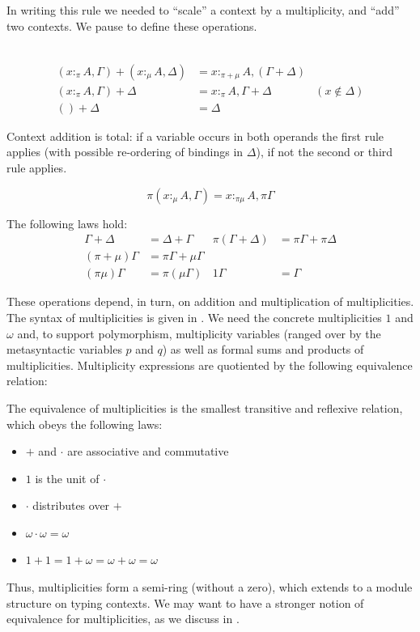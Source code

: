 \documentclass[acmsmall,screen]{acmart}\settopmatter{}
\begin{document}
In writing this rule we needed to ``scale'' a context by
a multiplicity, and ``add'' two contexts.  We pause to define these operations.
\begin{definition}~
  \begin{align*}
    (x :_π A,Γ) + (x :_{μ} A,Δ) &= x :_{π+μ} A, (Γ+Δ)\\
    (x :_π A,Γ) + Δ &= x :_π A, Γ+Δ & (x ∉ Δ)\\
    () + Δ &= Δ
  \end{align*}
\end{definition}
\noindent
Context addition is total: if a variable occurs in both operands the
first rule applies (with possible re-ordering of bindings in $Δ$), if
not the second or third rule applies.

\begin{definition}
  \begin{displaymath}
    π(x :_{μ} A, Γ) =  x :_{πμ} A, πΓ
  \end{displaymath}
\end{definition}

\begin{lemma}
  The following laws hold:
  \begin{align*}
    Γ + Δ &= Δ + Γ &
    π (Γ+Δ) &= π Γ + π Δ\\
    (π+μ) Γ &= π Γ+ μ Γ \\
    (πμ) Γ &= π (μ Γ) &
    1 Γ &= Γ
  \end{align*}
\end{lemma}

These operations depend, in turn, on addition and multiplication of multiplicities.
The syntax of multiplicities is given in .
We need the concrete multiplicities $1$ and $ω$ and, to support polymorphism,
multiplicity variables (ranged over by the metasyntactic
variables \(p\) and \(q\)) as well as formal sums and products of multiplicities.
%
Multiplicity expressions are quotiented by the following equivalence
relation:
\begin{definition}
  \label{def:equiv-multiplicity}
  The equivalence of multiplicities is the smallest transitive and
  reflexive relation, which obeys the following laws:
\begin{itemize}
\item $+$ and $·$ are associative and commutative
\item $1$ is the unit of $·$
\item $·$ distributes over $+$
\item $ω · ω = ω$
\item $1 + 1 = 1 + ω = ω + ω = ω$
\end{itemize}
\end{definition}
Thus, multiplicities form a semi-ring (without a zero), which extends
to a module structure on typing contexts. We may want to have a
stronger notion of equivalence for multiplicities, as we discuss in
.
\end{document}

